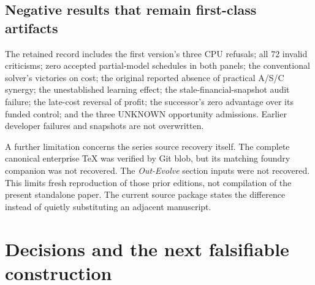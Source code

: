 \subsection{Negative results that remain first-class
artifacts}\label{negative-results-that-remain-first-class-artifacts}

The retained record includes the first version's three CPU refusals; all
72 invalid criticisms; zero accepted partial-model schedules in both
panels; the conventional solver's victories on cost; the original
reported absence of practical A/S/C synergy; the unestablished learning
effect; the stale-financial-snapshot audit failure; the late-cost
reversal of profit; the successor's zero advantage over its funded
control; and the three UNKNOWN opportunity admissions. Earlier developer
failures and snapshots are not overwritten.

A further limitation concerns the series source recovery itself. The
complete canonical enterprise TeX was verified by Git blob, but its
matching foundry companion was not recovered. The \emph{Out-Evolve}
section inputs were not recovered. This limits fresh reproduction of
those prior editions, not compilation of the present standalone paper.
The current source package states the difference instead of quietly
substituting an adjacent manuscript.

\section{Decisions and the next falsifiable
construction}\label{decisions}

